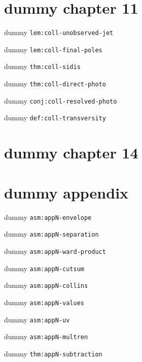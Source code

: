 \chapter{dummy chapter 11}
\begin{lemma}\label{lem:coll-unobserved-jet}dummy \texttt{lem:coll-unobserved-jet}\end{lemma}
\begin{lemma}\label{lem:coll-final-poles}dummy \texttt{lem:coll-final-poles}\end{lemma}
\begin{theorem}\label{thm:coll-sidis}dummy \texttt{thm:coll-sidis}\end{theorem}
\begin{theorem}\label{thm:coll-direct-photo}dummy \texttt{thm:coll-direct-photo}\end{theorem}
\begin{conjecture}\label{conj:coll-resolved-photo}dummy \texttt{conj:coll-resolved-photo}\end{conjecture}
\begin{definition}\label{def:coll-transversity}dummy \texttt{def:coll-transversity}\end{definition}
\setcounter{chapter}{14}\addtocounter{chapter}{-1}
\chapter{dummy chapter 14}\label{ch:tmd}
\appendix
\setcounter{chapter}{14}\addtocounter{chapter}{-1}
\chapter{dummy appendix}\label{app:appN}
\begin{assumption}\label{asm:appN-envelope}dummy \texttt{asm:appN-envelope}\end{assumption}
\begin{assumption}\label{asm:appN-separation}dummy \texttt{asm:appN-separation}\end{assumption}
\begin{assumption}\label{asm:appN-ward-product}dummy \texttt{asm:appN-ward-product}\end{assumption}
\begin{assumption}\label{asm:appN-cutsum}dummy \texttt{asm:appN-cutsum}\end{assumption}
\begin{assumption}\label{asm:appN-collins}dummy \texttt{asm:appN-collins}\end{assumption}
\begin{assumption}\label{asm:appN-values}dummy \texttt{asm:appN-values}\end{assumption}
\begin{assumption}\label{asm:appN-uv}dummy \texttt{asm:appN-uv}\end{assumption}
\begin{assumption}\label{asm:appN-multren}dummy \texttt{asm:appN-multren}\end{assumption}
\begin{theorem}\label{thm:appN-subtraction}dummy \texttt{thm:appN-subtraction}\end{theorem}
\setcounter{chapter}{15}\addtocounter{chapter}{-1}
